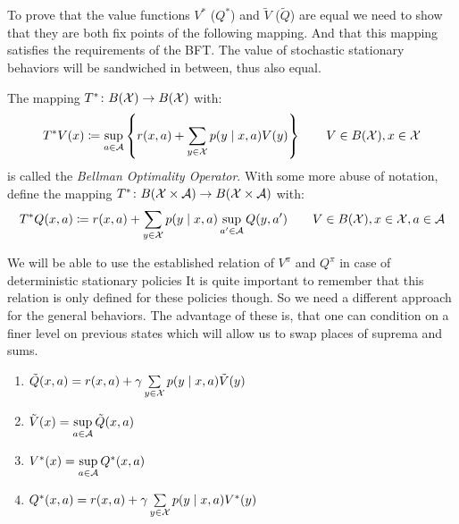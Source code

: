 To prove that the value functions \(V^*\) (\(Q^*\)) and \(\tilde{V}\) (\(\tilde{Q}\))  are equal we need to show that they are both fix points of the following mapping. 
And that this mapping satisfies the requirements of the BFT. The value of stochastic stationary behaviors will be sandwiched in between, thus also equal. 

\begin{definition}
The mapping \(T^*\colon B(\mathcal{X})\to B(\mathcal{X})\) with:
	\[
	 T^* V(x)\coloneqq \sup_{a\in\mathcal{A}}\left\{r(x,a)+\sum_{y\in\mathcal{X}}p(y\mid x,a) V(y)\right\} \qquad V\in B(\mathcal{X}), x\in\mathcal{X}
	\]
is called the \emph{Bellman Optimality Operator}. With some more abuse of notation, define the mapping \(T^*\colon B(\mathcal{X}\times\mathcal{A})\to B(\mathcal{X}\times\mathcal{A})\) with:
	\[
	T^* Q(x,a)\coloneqq r(x,a)+\sum_{y\in\mathcal{X}}p(y\mid x,a) \sup_{a'\in\mathcal{A}}Q(y,a') \qquad V\in B(\mathcal{X}), x\in\mathcal{X}, a\in\mathcal{A}
	\]
\end{definition}

We will be able to use the established relation of \(V^\pi\) and \(Q^\pi\) in case of deterministic stationary policies
It is quite important to remember that this relation is only defined for these policies though. So we need a different approach for the general behaviors. The advantage of these is, that one can condition on a finer level on previous states which will allow us to swap places of suprema and sums.


\begin{lemma}\label{V*,Q* relation}\leavevmode
\begin{enumerate}[label=\textbf{(\roman*)},font=\normalfont]
\item\label{i:1} \(\tilde{Q}(x,a)= r(x,a)+\gamma\sum\limits_{y\in\mathcal{X}}p(y\mid x,a)\tilde{V}(y)\)
\item\label{i:2} \(\tilde{V}(x)= \sup\limits_{a\in\mathcal{A}} \tilde{Q}(x,a)\)
\item\label{i:3} \(V^*(x)=\sup\limits_{a\in\mathcal{A}}Q^*(x,a)\)
\item\label{i:4} \(Q^*(x,a)=r(x,a)+\gamma \sum\limits_{y\in\mathcal{X}}p(y\mid x,a) V^*(y)\)
\end{enumerate}
\end{lemma}

